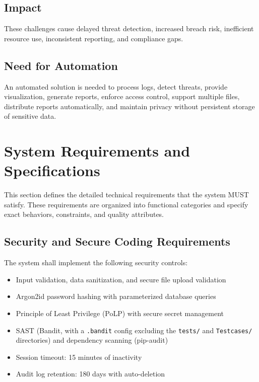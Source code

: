 \documentclass[12pt,a4paper]{article}
\begin{document}
\subsection{Impact}

These challenges cause delayed threat detection, increased breach risk, inefficient resource use, inconsistent reporting, and compliance gaps.

\subsection{Need for Automation}

An automated solution is needed to process logs, detect threats, provide visualization, generate reports, enforce access control, support multiple files, distribute reports automatically, and maintain privacy without persistent storage of sensitive data.

\newpage
\section{System Requirements and Specifications}

This section defines the detailed technical requirements that the system MUST satisfy. These requirements are organized into functional categories and specify exact behaviors, constraints, and quality attributes.

\subsection{Security and Secure Coding Requirements}

The system shall implement the following security controls:

\begin{itemize}
    \item Input validation, data sanitization, and secure file upload validation
    \item Argon2id password hashing with parameterized database queries
    \item Principle of Least Privilege (PoLP) with secure secret management
    \item SAST (Bandit, with a \texttt{.bandit} config excluding the \texttt{tests/} and \texttt{Testcases/} directories) and dependency scanning (pip-audit)
    \item Session timeout: 15 minutes of inactivity
    \item Audit log retention: 180 days with auto-deletion
\end{itemize}
\end{document}

